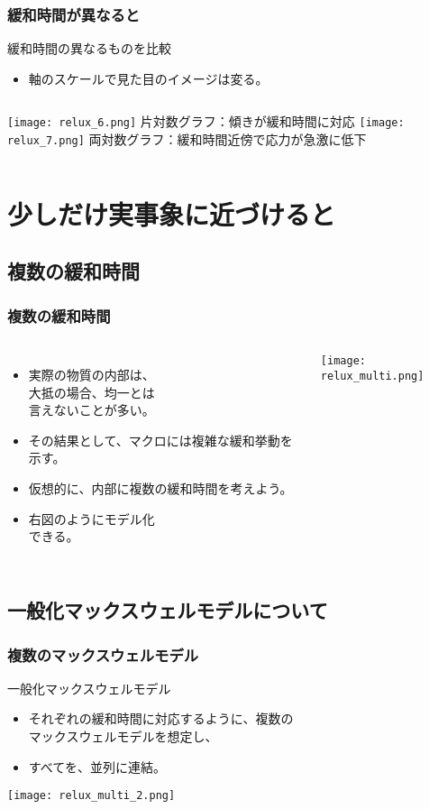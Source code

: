\documentclass[12pt, dvipdfmx]{beamer}
\begin{document}
\begin{frame}
	\frametitle{緩和時間が異なると}
		\begin{alertblock}{緩和時間の異なるものを比較}
			\begin{itemize}
				\item 軸のスケールで見た目のイメージは変る。
			\end{itemize}
		\end{alertblock}
		\begin{columns}[T, onlytextwidth]
				\texttt{[image: relux\_6.png]}
				片対数グラフ：傾きが緩和時間に対応
				\texttt{[image: relux\_7.png]}
				両対数グラフ：緩和時間近傍で応力が急激に低下
		\end{columns}
\end{frame}

\section{少しだけ実事象に近づけると}
\subsection{複数の緩和時間}
\begin{frame}
	\frametitle{複数の緩和時間}
		\begin{columns}[T, onlytextwidth]
			\begin{itemize}
				\item 実際の物質の内部は、\\大抵の場合、均一とは\\言えないことが多い。
				\item その結果として、マクロには複雑な緩和挙動を示す。
				\item \alert{仮想的}に、内部に\alert{複数の緩和時間}を考えよう。
				\item 右図のように\alert{モデル化}\\できる。
			\end{itemize}
				\texttt{[image: relux\_multi.png]}
		\end{columns}
\end{frame}

\subsection{一般化マックスウェルモデルについて}
\begin{frame}
	\frametitle{複数のマックスウェルモデル}
		\begin{block}{一般化マックスウェルモデル}
			\begin{itemize}
				\item \alert{それぞれの緩和時間に対応}するように、複数の\\マックスウェルモデルを想定し、
				\item すべてを、\alert{並列に連結}。
			\end{itemize}
		\end{block}
		\texttt{[image: relux\_multi\_2.png]}
\end{frame}
\end{document}
